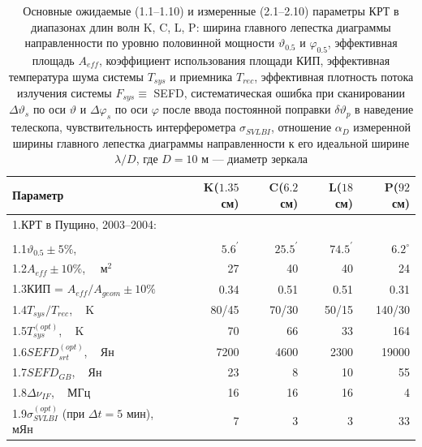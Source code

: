 \begin{table}[tbh]
\caption{Основные ожидаемые (1.1--1.10) и измеренные
(2.1--2.10) параметры КРТ в диапазонах длин волн K, C, L, P:
ширина главного лепестка диаграммы направленности по уровню
половинной мощности $\vartheta_{0.5}$ и $\varphi_{0.5}$,
эффективная площадь $A_{eff}$,
коэффициент использования площади КИП,
эффективная температура шума системы $T_{sys}$ и приемника
$T_{rec}$,
эффективная плотность потока излучения системы $F_{sys} \equiv$ SEFD,
систематическая ошибка при сканировании  $\Delta \vartheta_s$
по оси $\vartheta$ и $\Delta \varphi_s$ по оси $\varphi$
после ввода постоянной поправки $\delta \vartheta_p$ в
наведение телескопа,
чувствительность интерферометра $\sigma_{SVLBI}$,
отношение $\alpha_{D}$
измеренной ширины главного лепестка диаграммы направленности к его
идеальной ширине $\lambda / D$, где $D = 10$ м --- диаметр зеркала}
\bigskip
\label{tab:srt_params1}
\centering
    \begin{SingleSpace}
        \begin{tabular}{l|r|r|r|r}
        \toprule
        Параметр              &K($1.35$ см)&C($6.2$ см)&L($18$ см)&P($92$ см)\\
        \midrule
1.\quad  КРТ в Пущино, 2003--2004:& & & &\\
                                  & & & &\\
1.1\quad $\vartheta_{0.5} \pm 5\%$, \,\,\,\,\,\,\,\,\,
&  $5.6^\prime$ & $25.5^\prime$  & $74.5^\prime$ & $6.2^\circ$ \\
1.2\quad  $A_{eff} \pm 10\%$, \,\,\,\,  м$^2$     &   27 &   40 &   40 &  24\\
1.3\quad  КИП = $A_{eff}/A_{geom} \pm 10\%$ & 0.34 & 0.51 & 0.51 & 0.31\\
1.4\quad  $T_{sys}/T_{rec}$, \,\,\, K                                   &80/45 & 70/30 & 50/15
&140/30\\
1.5\quad  $T_{sys}^{(opt)}$, \,\,\, K                                    &70    & 66    &  33  &
164\\
1.6\quad  $SEFD_{srt}^{(opt)}$, \,\,\, Ян                                        &7200    &4600
&2300  &19000\\
1.7\quad  $SEFD_{GB}$, \,\,\, Ян                                         & 23     & 8     & 10   &
55\\
1.8\quad  $\Delta \nu_{IF}$, \,\,\, МГц                                   & 16     & 16    & 16   &
4\\
1.9\quad  $\sigma_{SVLBI}^{(opt)}$ (при $\Delta t = 5$ мин), \,\,\, мЯн  & 7   & 3   & 3   & 33\\

\end{tabular}
\end{SingleSpace}
\end{table}
